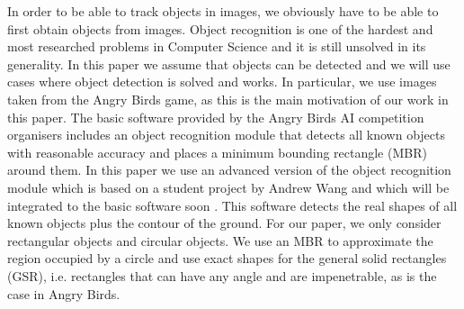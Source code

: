 \documentclass[letterpaper]{article}
\begin{document}
In order to be able to track objects in images, we obviously have to be able to first obtain objects from images. Object recognition \cite{belongie2002shape,lowe1999object} is one of the hardest and most researched problems in Computer Science and it is still unsolved in its generality. In this paper we assume that objects can be detected and we will use cases where object detection is solved and works. In particular, we use images taken from the Angry Birds game, as this is the main motivation of our work in this paper. 
The basic software provided by the Angry Birds AI competition organisers includes an object recognition module that detects all known objects with reasonable accuracy and places a minimum bounding rectangle (MBR) around them. In this paper we use an advanced version of the object recognition module which is based on a student project by Andrew Wang and which will be integrated to the basic software soon \cite{andrewwang}. This software detects the real shapes of all known objects plus the contour of the ground. For our paper, we only consider rectangular objects and circular objects. We use an MBR to approximate the region occupied by a circle and use exact shapes for the general solid rectangles (GSR), i.e. rectangles that can have any angle and are impenetrable, as is the case in Angry Birds. 
\end{document}
